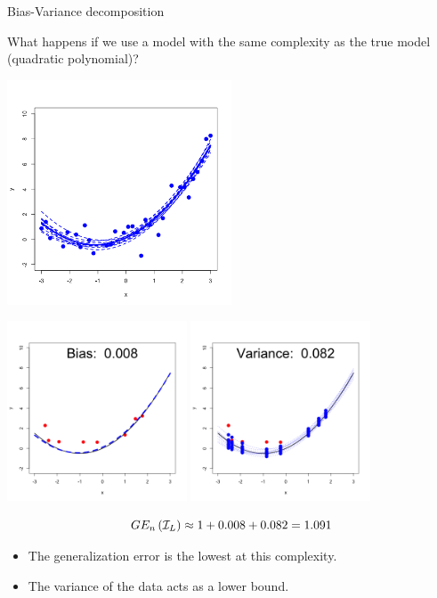 \documentclass[11pt,compress,t,notes=noshow, xcolor=table]{beamer}
\begin{document}
\begin{vbframe} {Bias-Variance decomposition}
\framebreak

What happens if we use a model with the same complexity as the true model (quadratic polynomial)? 

\begin{center}
  \includegraphics[width = 0.5\textwidth]{figure/bias_variance_decomposition-correct_model.png}
\end{center}

\framebreak

\begin{center}
  \includegraphics[width = 0.4\textwidth]{figure/bias_variance_decomposition-correct_model_bias.png}
  \includegraphics[width = 0.4\textwidth]{figure/bias_variance_decomposition-correct_model_variance.png}
\end{center}

$$GE_n\left(\mathcal{I}_{L}\right) \approx 1 + 0.008 + 0.082 = 1.091 $$

\begin{itemize}
  \item The generalization error is the lowest at this complexity.
  \item The variance of the data acts as a lower bound.
\end{itemize}
 

\end{vbframe}
\end{document}

